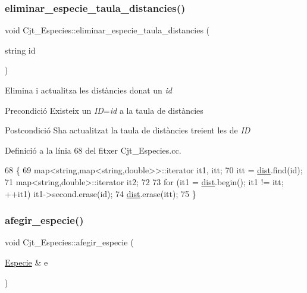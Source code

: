 \subsubsection{\texorpdfstring{eliminar\+\_\+especie\+\_\+taula\+\_\+distancies()}{eliminar\_especie\_taula\_distancies()}}
{\footnotesize\ttfamily void Cjt\+\_\+\+Especies\+::eliminar\+\_\+especie\+\_\+taula\+\_\+distancies (\begin{DoxyParamCaption}\item[{string}]{id }\end{DoxyParamCaption})\hspace{0.3cm}{\ttfamily [private]}}



Elimina i actualitza les distàncies donat un {\itshape id} 

\begin{DoxyPrecond}{Precondició}
Existeix un {\itshape ID}={\itshape id} a la taula de distàncies 
\end{DoxyPrecond}
\begin{DoxyPostcond}{Postcondició}
S\textquotesingle{}ha actualitzat la taula de distàncies treient les de {\itshape ID} 
\end{DoxyPostcond}


Definició a la línia 68 del fitxer Cjt\+\_\+\+Especies.\+cc.


\begin{DoxyCode}
68                                                               \{
69     map<string,map<string,double>>::iterator it1, itt;
70     itt = \hyperlink{class_cjt___especies_aaf5d15b706e8b0c5b910283d60ef58a6}{dist}.find(\textcolor{keywordtype}{id});
71     map<string,double>::iterator it2;
72     
73     \textcolor{keywordflow}{for} (it1 = \hyperlink{class_cjt___especies_aaf5d15b706e8b0c5b910283d60ef58a6}{dist}.begin(); it1 != itt; ++it1) it1->second.erase(\textcolor{keywordtype}{id});
74     \hyperlink{class_cjt___especies_aaf5d15b706e8b0c5b910283d60ef58a6}{dist}.erase(itt);
75 \}
\end{DoxyCode}
\mbox{\label{class_cjt___especies_aa70101c5e157fd855475248c174e41f1}} 
\subsubsection{\texorpdfstring{afegir\+\_\+especie()}{afegir\_especie()}}
{\footnotesize\ttfamily void Cjt\+\_\+\+Especies\+::afegir\+\_\+especie (\begin{DoxyParamCaption}\item[{\hyperlink{class_especie}{Especie} \&}]{e }\end{DoxyParamCaption})}



